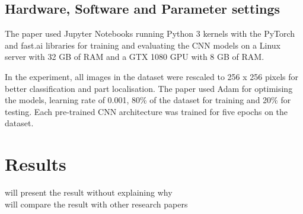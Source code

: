 \documentclass[conference]{IEEEtran}
\begin{document}
    

\subsection{Hardware, Software and Parameter settings}
The paper used Jupyter Notebooks \cite{kluyver2016jupyter} running Python 3 kernels with the PyTorch \cite{paszke2017automatic} and fast.ai \cite{howard2018fastai} libraries for training and evaluating the CNN models on a Linux server with 32 GB of RAM and a GTX 1080 GPU with 8 GB of RAM.

In the experiment, all images in the dataset were rescaled to 256 x 256 pixels for better classification and part localisation. The paper used Adam \cite{kingma2014adam} for optimising the models, learning rate of 0.001, 80\% of the dataset for training and 20\% for testing. Each pre-trained CNN architecture was trained for five epochs on the dataset.
\section{Results}
will present the result without explaining why\\
will compare the result with other research papers\\
\end{document}
